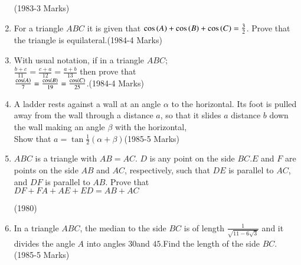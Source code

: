\documentclass[journal,12pt,twocolumn]{IEEEtran}
\theoremstyle{remark}
\begin{document}
\begin{enumerate}
    \hfill(1983-3 Marks)
    \item For a triangle $ABC$ it is given that $\cos\left(A\right)+\cos\left(B\right)+\cos\left(C\right)=\frac{3}{2}$. Prove that the triangle is equilateral.\hfill(1984-4 Marks)
    \item With usual notation, if in a triangle $ABC$;\\
    $\frac{b+c}{11}=\frac{c+a}{12}=\frac{a+b}{13}$ then prove that\\
    $\frac{\cos\left(A\right)}{7}=\frac{\cos\left(B\right)}{19}=\frac{\cos\left(C\right)}{25}$.\hfill(1984-4 Marks)
    \item A ladder rests against a wall at an angle $\alpha$ to the horizontal. Its foot is pulled away from the wall through a distance $a$, so that it slides $a$ distance $b$ down the wall making an angle $\beta$ with the horizontal,\\
    Show that $a=\tan \frac{1}{2}(\alpha+\beta)$\hfill(1985-5 Marks)
    \item $ABC$ is a triangle with $AB=AC$. $D$ is any point on the side $BC. E$ and $F$ are points on the side $AB$ and $AC$, respectively, such that $DE$ is parallel to $AC$, and $DF$ is parallel to $AB$. Prove that\\
    $DF+FA+AE+ED=AB+AC$

    \hfill(1980)
    \item In a triangle $ABC$, the median to the side $BC$ is of length $\frac{1}{\sqrt{11-6\sqrt{3}}}$ and it divides the angle $A$ into angles $30$\textdegree and $45$\textdegree.Find the length of the side $BC$.\hfill(1985-5 Marks)
\end{enumerate} 
\end{document}
